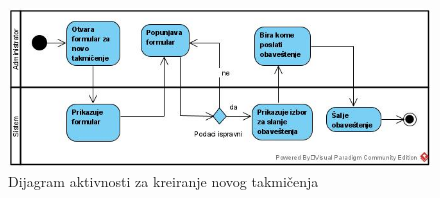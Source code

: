 \documentclass[../../main.tex]{subfiles}
\begin{document}
\begin{figure}[!ht]
\begin{center}
\includegraphics[scale=0.55]{sections/images/dijagram_atkivnovnosti_kreiranje_takmicenja.jpg}
\end{center}
\caption{Dijagram aktivnosti za kreiranje novog takmičenja}
\label{fig:kontekst}
\end{figure}
\end{document}
